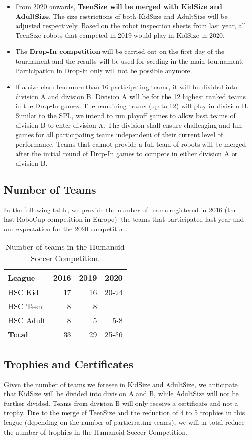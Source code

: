 \documentclass{article}
\begin{document}
\begin{itemize}
\item From 2020 onwards, \textbf{TeenSize will be merged with KidSize and AdultSize}. The size restrictions of both KidSize and AdultSize will be adjusted respectively. Based on the robot inspection sheets from last year, all TeenSize robots that competed in 2019 would play in KidSize in 2020.
\item The \textbf{Drop-In competition} will be carried out on the first day of the tournament and the results will be used for seeding in the main tournament. Participation in Drop-In only will not be possible anymore.
\item If a size class has more than 16 participating teams,
  it will be divided into division A and division B.
  Division A will be for the 12 highest ranked teams in the Drop-In games.
  The remaining teams (up to 12) will play in division B.
  Similar to the SPL, we intend to run playoff games to allow best
  teams of division B to enter division A.
  The division shall ensure challenging and fun games for all participating
  teams independent of their current level of performance.
  Teams that cannot provide a full team of robots will be merged after the
  initial round of Drop-In games to compete in either division A or division B.
\end{itemize}

\subsection{Number of Teams}
In the following table, we provide the number of teams registered in 2016 (the last RoboCup competition in Europe), the teams that participated last year and our expectation for the 2020 competition:

\begin{table}[h]
  \centering
  \begin{tabular}{l | r | r | r}
    League & 2016 & 2019 & 2020\\
    \hline
    HSC Kid & 17 & 16 & 20-24\\ 
    HSC Teen & 8 & 8 & \\ 
    HSC Adult & 8 & 5 & 5-8\\ 
    \hline
    \textbf{Total} & 33 & 29 & 25-36
  \end{tabular}
  \caption{Number of teams in the Humanoid Soccer Competition.}
\end{table}

\subsection{Trophies and Certificates}
Given the number of teams we foresee in KidSize and AdultSize,
we anticipate that KidSize will be divided into division A and B,
while AdultSize will not be further divided.
Teams from division B will only receive a certificate and not a trophy.
Due to the merge of TeenSize and the reduction of 4 to 5 trophies in this league
(depending on the number of participating teams),
we will in total reduce the number of trophies in the Humanoid Soccer Competition.
\end{document}
